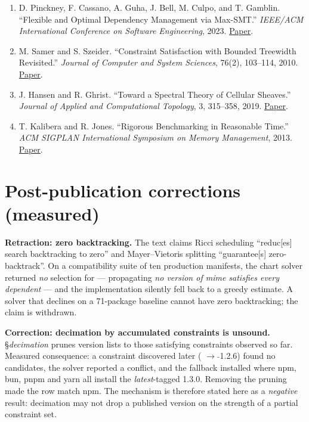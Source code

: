 \documentclass[
  11pt,
  letterpaper,
]{article}
\providecommand{\tightlist}{%
  \setlength{\itemsep}{0pt}\setlength{\parskip}{0pt}}
\begin{document}
\begin{enumerate}
\def\labelenumi{\arabic{enumi}.}
\tightlist
\item
  D. Pinckney, F. Cassano, A. Guha, J. Bell, M. Culpo, and T. Gamblin.
  ``Flexible and Optimal Dependency Management via Max-SMT.''
  \emph{IEEE/ACM International Conference on Software Engineering},
  2023. \href{https://arxiv.org/abs/2203.13737}{Paper}.
\item
  M. Samer and S. Szeider. ``Constraint Satisfaction with Bounded
  Treewidth Revisited.'' \emph{Journal of Computer and System Sciences},
  76(2), 103--114, 2010.
  \href{https://www.ac.tuwien.ac.at/files/pub/SamerSzeider10a.pdf}{Paper}.
\item
  J. Hansen and R. Ghrist. ``Toward a Spectral Theory of Cellular
  Sheaves.'' \emph{Journal of Applied and Computational Topology}, 3,
  315--358, 2019. \href{https://arxiv.org/abs/1808.01513}{Paper}.
\item
  T. Kalibera and R. Jones. ``Rigorous Benchmarking in Reasonable
  Time.'' \emph{ACM SIGPLAN International Symposium on Memory
  Management}, 2013. \href{https://kar.kent.ac.uk/33611/}{Paper}.
\end{enumerate}


\section*{Post-publication corrections (measured)}

\textbf{Retraction: zero backtracking.} The text claims Ricci scheduling ``reduc[es] search
backtracking to zero'' and Mayer--Vietoris splitting ``guarantee[s] zero-backtrack''. On a
compatibility suite of ten production manifests, the chart solver returned \emph{no} selection for
 --- propagating \emph{no version of mime satisfies every dependent} --- and the
implementation silently fell back to a greedy estimate. A solver that declines on a 71-package
baseline cannot have zero backtracking; the claim is withdrawn.

\textbf{Correction: decimation by accumulated constraints is unsound.} \S\emph{decimation} prunes
version lists to those satisfying constraints observed so far. Measured consequence: a constraint
discovered later ( $\rightarrow$  $\tilde{}$1.2.6) found no candidates, the
solver reported a conflict, and the fallback installed  where npm, bun,
pnpm and yarn all install the \emph{latest}-tagged 1.3.0. Removing the pruning made the row match
npm. The mechanism is therefore stated here as a \emph{negative} result: decimation may not drop a
published version on the strength of a partial constraint set.
\end{document}
